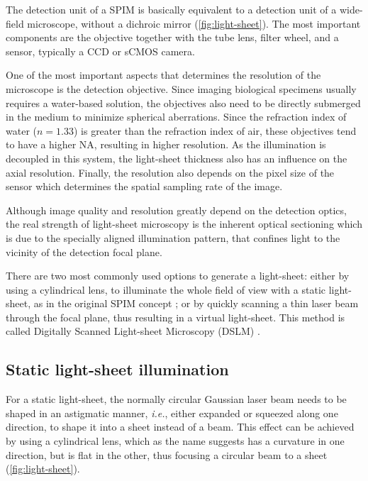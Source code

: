     The detection unit of a SPIM is basically equivalent to a detection unit of a wide-field microscope, without a dichroic mirror (\autoref{fig:light-sheet}). The most important components are the objective together with the tube lens, filter wheel, and a sensor, typically a CCD or sCMOS camera.

    One of the most important aspects that determines the resolution of the microscope is the detection objective. Since imaging biological specimens usually requires a water-based solution, the objectives also need to be directly submerged in the medium to minimize spherical aberrations. Since the refraction index of water ($n=1.33$) is greater than the refraction index of air, these objectives tend to have a higher NA, resulting in higher resolution. As the illumination is decoupled in this system, the light-sheet thickness also has an influence on the axial resolution. Finally, the resolution also depends on the pixel size of the sensor which determines the spatial sampling rate of the image.

    Although image quality and resolution greatly depend on the detection optics, the real strength of light-sheet microscopy is the inherent optical sectioning which is due to the specially aligned illumination pattern, that confines light to the vicinity of the detection focal plane.

    There are two most commonly used options to generate a light-sheet: either by using a cylindrical lens, to illuminate the whole field of view with a static light-sheet, as in the original SPIM concept \cite{huisken_optical_2004}; or by quickly scanning a thin laser beam through the focal plane, thus resulting in a virtual light-sheet. This method is called Digitally Scanned Light-sheet Microscopy (DSLM) \cite{keller_reconstruction_2008}.



  \subsection{Static light-sheet illumination}
    For a static light-sheet, the normally circular Gaussian laser beam needs to be shaped in an astigmatic manner, \textit{i.e.}, either expanded or squeezed along one direction, to shape it into a sheet instead of a beam. This effect can be achieved by using a cylindrical lens, which as the name suggests has a curvature in one direction, but is flat in the other, thus focusing a circular beam to a sheet (\autoref{fig:light-sheet}).
    
